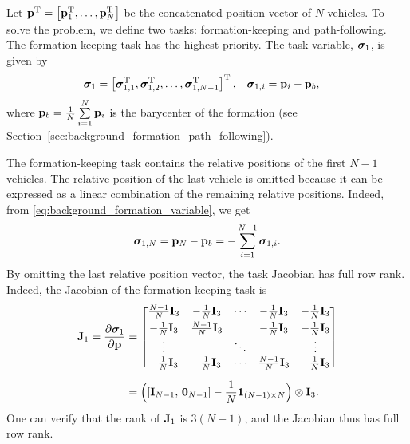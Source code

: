 Let $\mathbf{p}^{\mathrm{T}} = \left[\mathbf{p}_1^{\mathrm{T}}, \ldots, \mathbf{p}_N^{\mathrm{T}}\right]$ be the concatenated position vector of $N$ vehicles.
To solve the problem, we define two tasks: formation-keeping and path-following.
The formation-keeping task has the highest priority.
The task variable, $\bm{\sigma}_1$, is given by
\begin{align}
    \bm{\sigma}_1 &= \left[\bm{\sigma}_{1, 1}^{\mathrm{T}}, \bm{\sigma}_{1, 2}^{\mathrm{T}}, \ldots, \bm{\sigma}_{1, N-1}^{\mathrm{T}}\right]^{\mathrm{T}}, &
    \bm{\sigma}_{1, i} &= \mathbf{p}_i - \mathbf{p}_b,
    \label{eq:background_formation_variable}
\end{align}
where $\mathbf{p}_b = \frac{1}{N}\sum\limits_{i=1}^N \mathbf{p}_i$ is the barycenter of the formation (see Section~\ref{sec:background_formation_path_following}).

\begin{rmk*}
    The formation-keeping task contains the relative positions of the first $N-1$ vehicles.
    The relative position of the last vehicle is omitted because it can be expressed as a linear combination of the remaining relative positions.
    Indeed, from \eqref{eq:background_formation_variable}, we get
    \begin{equation}
        \bm{\sigma}_{1, N} = \mathbf{p}_N - \mathbf{p}_b = - \sum_{i=1}^{N-1} \bm{\sigma}_{1, i}.
    \end{equation}
    By omitting the last relative position vector, the task Jacobian has full row rank.
    Indeed, the Jacobian of the formation-keeping task is
    \begin{equation}
        \begin{split}
            \mathbf{J}_1 = \frac{\partial \bm{\sigma}_1}{\partial \mathbf{p}} &= 
            \begin{bmatrix}
                \frac{N-1}{N} \mathbf{I}_3 & -\frac{1}{N} \mathbf{I}_3 & \cdots & -\frac{1}{N} \mathbf{I}_3 & -\frac{1}{N} \mathbf{I}_3 \\[3pt]
                -\frac{1}{N} \mathbf{I}_3 & \frac{N-1}{N} \mathbf{I}_3 & & -\frac{1}{N} \mathbf{I}_3 & -\frac{1}{N} \mathbf{I}_3 \\ 
                \vdots & & \ddots & & \vdots \\
                -\frac{1}{N} \mathbf{I}_3 & -\frac{1}{N} \mathbf{I}_3 & \cdots & \frac{N-1}{N} \mathbf{I}_3 & -\frac{1}{N} \mathbf{I}_3
            \end{bmatrix} \\[6pt]
            &= \Bigl(\left[\mathbf{I}_{N-1},\, \mathbf{0}_{N-1}\right] - \frac{1}{N} \mathbf{1}_{(N-1) \times N} \Bigr) \otimes \mathbf{I}_3.
        \end{split}
        \label{eq:background_NSB_formation_jacobian}
    \end{equation}
    One can verify that the rank of $\mathbf{J}_1$ is $3(N-1)$, and the Jacobian thus has full row rank.
\end{rmk*}


